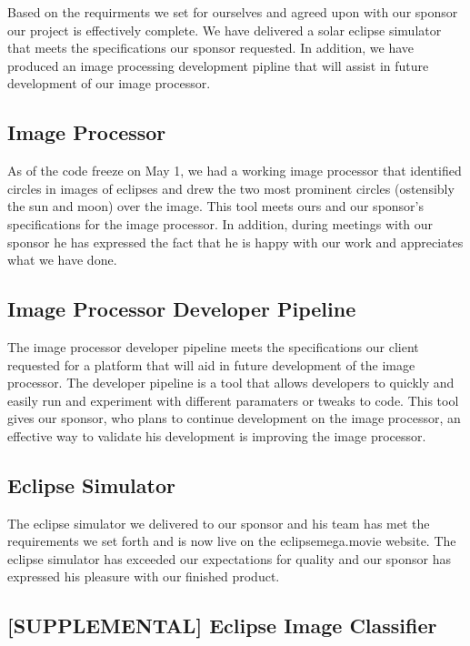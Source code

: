 \documentclass[10pt, onecolumn, draftclsnofoot, letterpaper, compsoc]{IEEEtran}
\begin{document}
Based on the requirments we set for ourselves and agreed upon with our sponsor
our project is effectively complete. We have delivered a solar eclipse simulator
that meets the specifications our sponsor requested. In addition, we have
produced an image processing development pipline that will assist in future
development of our image processor. \\

\subsection{Image Processor}

As of the code freeze on May 1, we had a working image processor that identified
circles in images of eclipses and drew the two most prominent circles
(ostensibly the sun and moon) over the image. This tool meets ours and our
sponsor's specifications for the image processor. In addition, during meetings
with our sponsor he has expressed the fact that he is happy with our work and
appreciates what we have done. \\

\subsection{Image Processor Developer Pipeline}

The image processor developer pipeline meets the specifications our client
requested for a platform that will aid in future development of the image
processor. The developer pipeline is a tool that allows developers to quickly
and easily run and experiment with different paramaters or tweaks to code. This
tool gives our sponsor, who plans to continue development on the image processor,
an effective way to validate his development is improving the image processor. \\

\subsection{Eclipse Simulator}

The eclipse simulator we delivered to our sponsor and his team has met the
requirements we set forth and is now live on the eclipsemega.movie website. The
eclipse simulator has exceeded our expectations for quality and our sponsor has
expressed his pleasure with our finished product. \\

\subsection{[SUPPLEMENTAL] Eclipse Image Classifier}
\end{document}
